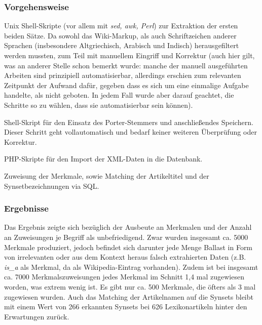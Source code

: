 \documentclass[pagesize,DIV=calc,12pt,draft]{scrreprt}
\begin{document}
\subsubsection{Vorgehensweise}

\begin{inparaenum}
\item
  Unix Shell-Skripte (vor allem mit \emph{sed, awk, Perl})
  zur Extraktion der ersten beiden Sätze. Da sowohl das Wiki-Markup, als
  auch Schriftzeichen anderer Sprachen (insbesondere Altgriechisch,
  Arabisch und Indisch) herausgefiltert werden mussten, zum Teil mit
  manuellem Eingriff und Korrektur (auch hier gilt, was an anderer
  Stelle schon bemerkt wurde: manche der manuell ausgeführten Arbeiten
  sind prinzipiell automatisierbar, allerdings erschien zum relevanten
  Zeitpunkt der Aufwand dafür, gegeben dass es sich um eine einmalige
  Aufgabe handelte, als nicht geboten. In jedem Fall wurde aber darauf
  geachtet, die Schritte so zu wählen, dass sie automatisierbar sein
  können).

\item
  Shell-Skript für den Einsatz des Porter-Stemmers und anschließendes
  Speichern. Dieser Schritt geht vollautomatisch und bedarf keiner
  weiteren Überprüfung oder Korrektur.

\item
  PHP-Skripte für den Import der XML-Daten in die Datenbank.

\item
  Zuweisung der Merkmale, sowie Matching der Artikeltitel und der
  Synsetbezeichnungen via SQL.
\end{inparaenum}

\subsubsection{Ergebnisse}

Das Ergebnis zeigte sich bezüglich der Ausbeute an Merkmalen und der
Anzahl an Zuweisungen je Begriff als unbefriedigend. Zwar wurden
insgesamt ca. 5000 Merkmale produziert, jedoch befindet sich darunter
jede Menge Ballast in Form von irrelevanten oder aus dem Kontext heraus
falsch extrahierten Daten (z.B. \emph{is\_a} als Merkmal, da als
Wikipedia-Eintrag vorhanden). Zudem ist bei insgesamt ca. 7000
Merkmalszuweisungen jedes Merkmal im Schnitt 1,4 mal zugewiesen worden,
was extrem wenig ist. Es gibt nur ca. 500 Merkmale, die öfters als 3 mal
zugewiesen wurden. Auch das Matching der Artikelnamen auf die Synsets
bleibt mit einem Wert von 266 erkannten Synsets bei 626 Lexikonartikeln
hinter den Erwartungen zurück.
\end{document}
